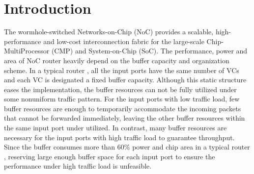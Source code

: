 \documentclass[10pt,conference]{IEEEtran}
\begin{document}
\section{Introduction}
The wormhole-switched Networks-on-Chip (NoC) provides a scalable, high-performance and low-cost interconnection fabric for the large-scale Chip-MultiProcessor (CMP) and System-on-Chip (SoC). The performance, power and area of NoC router heavily depend on the buffer capacity and organization scheme. In a typical router \cite{DaTo01}, all the input ports have the same number of VCs and each VC is designated a fixed buffer capacity. Although this static structure eases the implementation, the buffer resources can not be fully utilized under some nonuniform traffic pattern. For the input ports with low traffic load, few buffer resources are enough to temporarily accommodate the incoming packets that cannot be forwarded immediately, leaving the other buffer resources within the same input port under utilized. In contrast, many buffer resources are necessary for the input ports with high traffic load to guarantee throughput. Since the buffer consumes more than 60\% power and chip area in a typical router \cite{1650108}\cite{ChPe03}, reserving large enough buffer space for each input port to ensure the performance under high traffic load is unfeasible.

\end{document}
